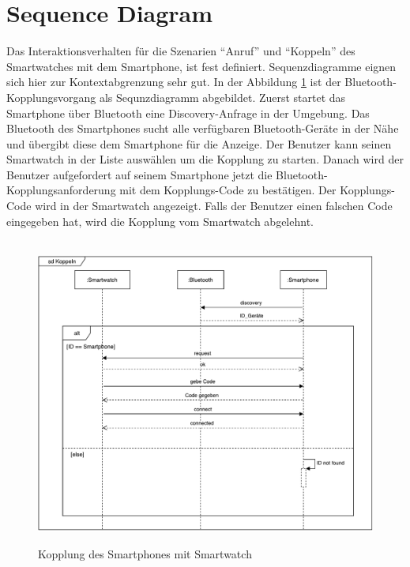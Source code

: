\section{Sequence Diagram}
Das Interaktionsverhalten für die Szenarien ``Anruf'' und ``Koppeln'' des Smartwatches mit dem Smartphone, ist fest definiert. Sequenzdiagramme eignen sich hier zur Kontextabgrenzung sehr gut.
In der Abbildung \ref{fig:kopplung} ist der Bluetooth-Kopplungsvorgang als Sequnzdiagramm abgebildet.
Zuerst startet das Smartphone über Bluetooth eine Discovery-Anfrage in der Umgebung.
Das Bluetooth des Smartphones sucht alle verfügbaren Bluetooth-Geräte in der Nähe und übergibt diese dem Smartphone für die Anzeige.
Der Benutzer kann seinen Smartwatch in der Liste auswählen um die Kopplung zu starten.
Danach wird der Benutzer aufgefordert auf seinem Smartphone jetzt die Bluetooth-Kopplungsanforderung mit dem Kopplungs-Code zu bestätigen. Der Kopplungs-Code wird in der Smartwatch angezeigt.
Falls der Benutzer einen falschen Code eingegeben hat, wird die Kopplung vom Smartwatch
abgelehnt.
\begin{figure}[h]
\centering\
\includegraphics[width=14cm]{img/KoppelnSequenz}
\caption{Kopplung des Smartphones mit Smartwatch}\label{fig:kopplung}
\end{figure}



